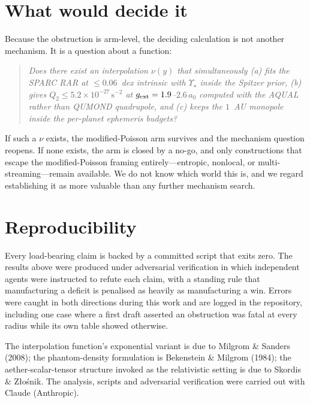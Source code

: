 \documentclass[aps,prd,twocolumn,superscriptaddress,nofootinbib,floatfix]{revtex4-2}
\begin{document}
\section{What would decide it}

Because the obstruction is arm-level, the deciding calculation is not another mechanism.
It is a question about a function:

\begin{quote}
\emph{Does there exist an interpolation $\nu(y)$ that simultaneously (a) fits the SPARC RAR
at $\le0.06$~dex intrinsic with $\Upsilon_\star$ inside the Spitzer prior, (b) gives
$Q_2 \le 5.2\times10^{-27}\,\mathrm{s^{-2}}$ at $g_{\rm ext} = 1.9$--$2.6\,a_0$ computed
with the AQUAL rather than QUMOND quadrupole, and (c) keeps the $1$~AU monopole inside the
per-planet ephemeris budgets?}
\end{quote}

If such a $\nu$ exists, the modified-Poisson arm survives and the mechanism question
reopens. If none exists, the arm is closed by a no-go, and only constructions that escape
the modified-Poisson framing entirely---entropic, nonlocal, or multi-streaming---remain
available. We do not know which world this is, and we regard establishing it as more
valuable than any further mechanism search.

\section{Reproducibility}

Every load-bearing claim is backed by a committed script that exits zero. The results
above were produced under adversarial verification in which independent agents were
instructed to refute each claim, with a standing rule that manufacturing a deficit is
penalised as heavily as manufacturing a win. Errors were caught in both directions during
this work and are logged in the repository, including one case where a first draft
asserted an obstruction was fatal at every radius while its own table showed otherwise.

\begin{acknowledgments}
The interpolation function's exponential variant is due to Milgrom \& Sanders (2008); the
phantom-density formulation is Bekenstein \& Milgrom (1984); the aether-scalar-tensor
structure invoked as the relativistic setting is due to Skordis \& Z\l{}o\'snik. The
analysis, scripts and adversarial verification were carried out with Claude (Anthropic).
\end{acknowledgments}
\end{document}
